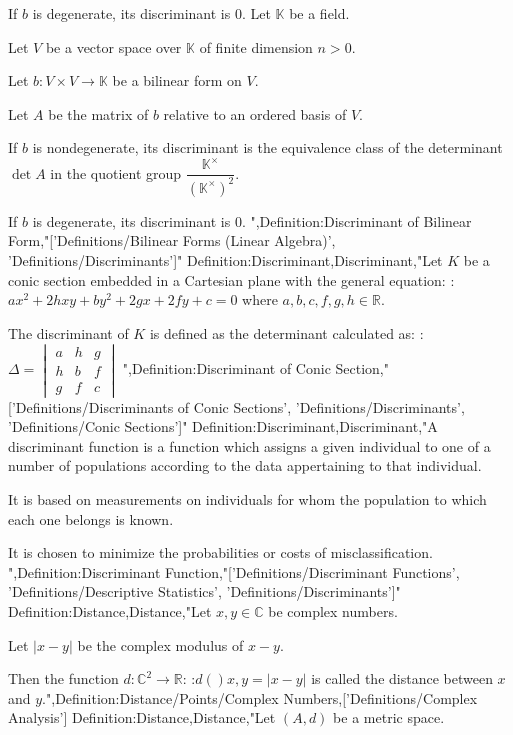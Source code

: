 If $b$ is degenerate, its discriminant is $0$.
Let $\mathbb K$ be a field.

Let $V$ be a vector space over $\mathbb K$ of finite dimension $n>0$.

Let $b : V\times V \to \mathbb K$ be a bilinear form on $V$.

Let $A$ be the matrix of $b$ relative to an ordered basis of $V$.


If $b$ is nondegenerate, its discriminant is the equivalence class of the determinant $\det A$ in the quotient group $\dfrac {\mathbb K^\times} {\left( \mathbb K^\times \right)^2}$.

If $b$ is degenerate, its discriminant is $0$.
",Definition:Discriminant of Bilinear Form,"['Definitions/Bilinear Forms (Linear Algebra)', 'Definitions/Discriminants']"
Definition:Discriminant,Discriminant,"Let $K$ be a conic section embedded in a Cartesian plane with the general equation:
:$a x^2 + 2 h x y + b y^2 + 2 g x + 2 f y + c = 0$
where $a, b, c, f, g, h \in \mathbb R$.


The discriminant of $K$ is defined as the determinant calculated as:
:$\Delta = \begin {vmatrix} a & h & g \\ h & b & f \\ g & f & c \end {vmatrix}$
",Definition:Discriminant of Conic Section,"['Definitions/Discriminants of Conic Sections', 'Definitions/Discriminants', 'Definitions/Conic Sections']"
Definition:Discriminant,Discriminant,"A discriminant function is a function which assigns a given individual to one of a number of populations according to the data appertaining to that individual.

It is based on measurements on individuals for whom the population to which each one belongs is known.

It is chosen to minimize the probabilities or costs of misclassification.
",Definition:Discriminant Function,"['Definitions/Discriminant Functions', 'Definitions/Descriptive Statistics', 'Definitions/Discriminants']"
Definition:Distance,Distance,"Let $x, y \in \mathbb C$ be complex numbers.

Let $\left\lvert x - y \right\rvert$ be the complex modulus of $x - y$.


Then the function $d: \mathbb C^2 \to \mathbb R$:
:$d \left(   \right){x, y} = \left\lvert x - y \right\rvert$
is called the distance between $x$ and $y$.",Definition:Distance/Points/Complex Numbers,['Definitions/Complex Analysis']
Definition:Distance,Distance,"Let $\left( A, d \right)$ be a metric space.


